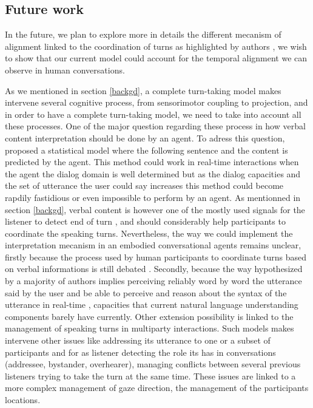 \subsection{Future work}

In the future, we plan to explore more in details the different mecanism of alignment linked to the coordination of turns as highlighted by authors \citep{benus_pragmatic_2011}, we wish to show that our current model could account for the temporal alignment we can observe in human conversations.  

As we mentioned in section \ref{backgd}, a complete turn-taking model makes intervene several cognitive process, from sensorimotor coupling to projection, and in order to have a complete turn-taking model, we need to take into account all these processes. One of the major question regarding these process in how verbal content interpretation should be done by an agent. To adress this question, \cite{de_vault_incremental_2011} proposed a statistical model where the following sentence and the content is predicted by the agent. This method could work in real-time interactions when the agent the dialog domain is well determined but as the dialog capacities and the set of utterance the user could say increases this method could become rapdily fastidious or even impossible to perform by an agent. 
As mentionned in section \ref{backgd}, verbal content is however one of the mostly used signals for the listener to detect end of turn \cite{de_ruiter_projecting_2006}, and should considerably help participants to coordinate the speaking turns. Nevertheless, the way we could implement the interpretation mecanism in an embodied conversational agents remains unclear, firstly because the process used by human participants to coordinate turns based on verbal informations is still debated \citep{heldner_pauses_2010,magyari_prediction_2012,riest_anticipation_2015}. Secondly, because the way hypothesized by a majority of authors implies perceiving reliably word by word the utterance said by the user and be able to perceive and reason about the syntax of the utterance in real-time \citep{sacks_simplest_1974}, capacities that current natural language understanding components barely have currently. 
Other extension possibility is linked to the management of speaking turns in multiparty interactions. Such models makes intervene other issues like addressing its utterance to one or a subset of participants and for as listener detecting the role its has in conversations (addressee, bystander, overhearer), managing conflicts between several previous listeners trying to take the turn at the same time. These issues are linked to a more complex management of gaze direction, the management of the participants locations. 
